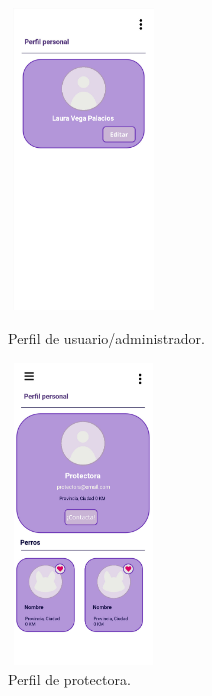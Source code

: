 \documentclass[a4paper, 12pt]{article}
\begin{document}
\begin{figure}[H]
   	\begin{minipage}{0.48\textwidth}
		\begin{center}
			{\includegraphics[height=8cm, width=4cm]{UserProfile.jpg}\par}
			\caption{Perfil de usuario/administrador.}
			\medskip

		\end{center}  
	\end{minipage}\hfill
   	\begin{minipage}{0.48\textwidth}
		\begin{center}
			{\includegraphics[height=8cm, width=4cm]{CompanyProfile.jpg}\par}
			\caption{Perfil de protectora. }
			\medskip
		\end{center}  
	\end{minipage}\hfill
\end{figure}
\end{document}
